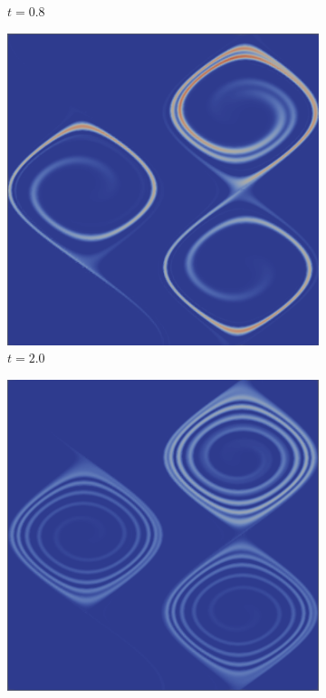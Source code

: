 \documentclass[review]{siamart}
\begin{document}
\begin{figure}[!htb]
\begin{subfigure}[b]{0.3\textwidth}
    \caption{$t = 0.8$}
  \end{subfigure}
   \begin{subfigure}[b]{0.3\textwidth}
    \includegraphics[width=\textwidth]{./figures/solution.0020.png}
    \caption{$t = 2.0$}
  \end{subfigure}
  \begin{subfigure}[b]{0.3\textwidth}
    \includegraphics[width=\textwidth]{./figures/solution.0070.png}

\end{subfigure}
\end{figure}
\end{document}
